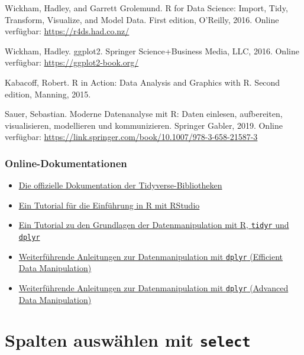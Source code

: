 \documentclass[
]{book}
\providecommand{\tightlist}{%
  \setlength{\itemsep}{0pt}\setlength{\parskip}{0pt}}
\begin{document}
Wickham, Hadley, and Garrett Grolemund. R for Data Science: Import, Tidy, Transform, Visualize, and Model Data. First edition, O'Reilly, 2016. Online verfügbar: \href{https://r4ds.had.co.nz}{https://r4ds.had.co.nz/}

Wickham, Hadley. ggplot2. Springer Science+Business Media, LLC, 2016. Online verfügbar: \href{https://ggplot2-book.org}{https://ggplot2-book.org/}

Kabacoff, Robert. R in Action: Data Analysis and Graphics with R. Second edition, Manning, 2015.

Sauer, Sebastian. Moderne Datenanalyse mit R: Daten einlesen, aufbereiten, visualisieren, modellieren und kommunizieren. Springer Gabler, 2019. Online verfügbar: \url{https://link.springer.com/book/10.1007/978-3-658-21587-3}

\hypertarget{online-dokumentationen}{%
\subsection{Online-Dokumentationen}\label{online-dokumentationen}}

\begin{itemize}
\tightlist
\item
  \href{https://www.tidyverse.org/}{Die offizielle Dokumentation der Tidyverse-Bibliotheken}
\item
  \href{https://ourcodingclub.github.io/tutorials/intro-to-r/}{Ein Tutorial für die Einführung in R mit RStudio}
\item
  \href{https://ourcodingclub.github.io/tutorials/data-manip-intro/}{Ein Tutorial zu den Grundlagen der Datenmanipulation mit R, \texttt{tidyr} und \texttt{dplyr}}
\item
  \href{https://ourcodingclub.github.io/tutorials/data-manip-efficient/}{Weiterführende Anleitungen zur Datenmanipulation mit \texttt{dplyr} (Efficient Data Manipulation)}
\item
  \href{https://ourcodingclub.github.io/tutorials/data-manip-creative-dplyr/}{Weiterführende Anleitungen zur Datenmanipulation mit \texttt{dplyr} (Advanced Data Manipulation)}
\end{itemize}

\hypertarget{spalten-auswuxe4hlen-mit-select}{%
\chapter{\texorpdfstring{Spalten auswählen mit \texttt{select}}{Spalten auswählen mit select}}\label{spalten-auswuxe4hlen-mit-select}}
\end{document}
